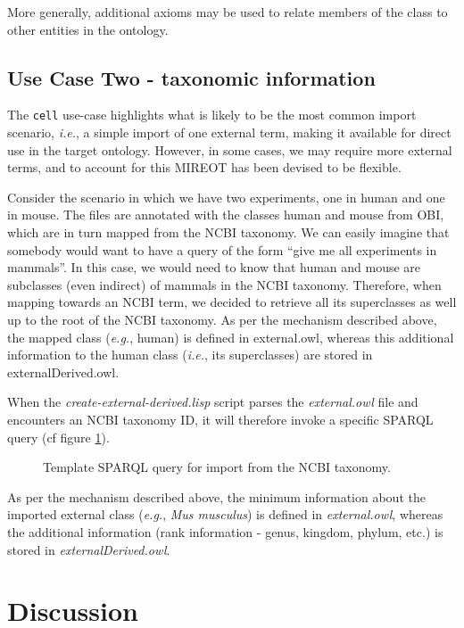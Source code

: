 \documentclass{ao2e}%
\begin{document}
More generally, additional axioms may be used to relate members of the class to other entities in the ontology.


\subsection*{Use Case Two - taxonomic information}

The \texttt{cell} use-case highlights what is likely to be the most common import scenario, \emph{i.e.}, a simple import of one external term, making it available for direct use in the target ontology.
However, in some cases, we may require more external terms, and to account for this \ac{MIREOT} has been devised to be flexible.

Consider the scenario in which we have two experiments, one in human and one in mouse. 
The files are annotated with the classes human and mouse from OBI, which are in turn 
mapped from the NCBI taxonomy. 
We can easily imagine that somebody would want to have a query of the form ``give me all 
experiments in mammals''. In this case, we would need to know that human and mouse are 
subclasses (even indirect) of mammals in the NCBI taxonomy. Therefore, when mapping 
towards an NCBI term, we decided to retrieve all its superclasses as well up to the root of the 
NCBI taxonomy. As per the mechanism described above, the mapped class (\emph{e.g.}, human) is 
defined in external.owl, whereas this additional information to the human class (\emph{i.e.}, its 
superclasses) are stored in externalDerived.owl. 



When the \emph{create-external-derived.lisp} script parses the \emph{external.owl} file and encounters an NCBI taxonomy ID, it will therefore invoke a specific SPARQL query (cf figure \ref{fig:sparql2}). 
\begin{figure}[t]
\scriptsize
 
\caption{Template SPARQL query for import from the NCBI taxonomy.}
\label{fig:sparql2}
\end{figure}
As per the mechanism described above, the minimum information about the imported external class (\emph{e.g.}, \emph{Mus musculus}) is defined in \emph{external.owl}, whereas the additional information (rank information - genus, kingdom, phylum, etc.) is stored in \emph{ externalDerived.owl}.%


\section*{Discussion}
\end{document}
